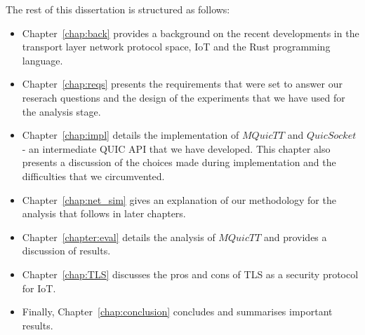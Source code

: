 The rest of this dissertation is structured as follows:
\begin{itemize}
    \item Chapter~\ref{chap:back} provides a background on the recent developments in the transport layer network protocol space, IoT and the Rust programming language.
    \item Chapter~\ref{chap:reqs} presents the requirements that were set to answer our reserach questions and the design of the experiments that we have used for the analysis stage.
    \item Chapter~\ref{chap:impl} details the implementation of $MQuicTT$ and $QuicSocket$ - an intermediate QUIC API that we have developed. This chapter also presents a discussion of the choices made during implementation and the difficulties that we circumvented.
    \item Chapter~\ref{chap:net_sim} gives an explanation of our methodology for the analysis that follows in later chapters.
    \item Chapter~\ref{chapter:eval} details the analysis of $MQuicTT$ and provides a discussion of results.
    \item Chapter~\ref{chap:TLS} discusses the pros and cons of TLS as a security protocol for IoT.
    \item Finally, Chapter~\ref{chap:conclusion} concludes and summarises important results.
\end{itemize}